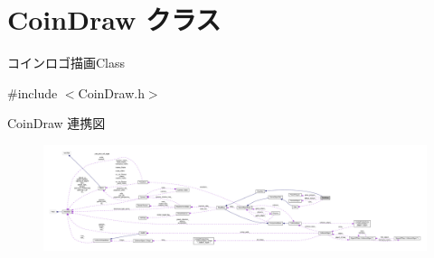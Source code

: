 \hypertarget{class_coin_draw}{}\section{Coin\+Draw クラス}
\label{class_coin_draw}


コインロゴ描画\+Class  




{\ttfamily \#include $<$Coin\+Draw.\+h$>$}



Coin\+Draw 連携図\nopagebreak
\begin{figure}[H]
\begin{center}
\leavevmode
\includegraphics[width=350pt]{class_coin_draw__coll__graph}
\end{center}
\end{figure}
